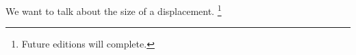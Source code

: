 
We want to talk about the size of a displacement.
  \ifhmode\unskip\fi\footnote{
Future editions will complete.
  }

\blankpage
